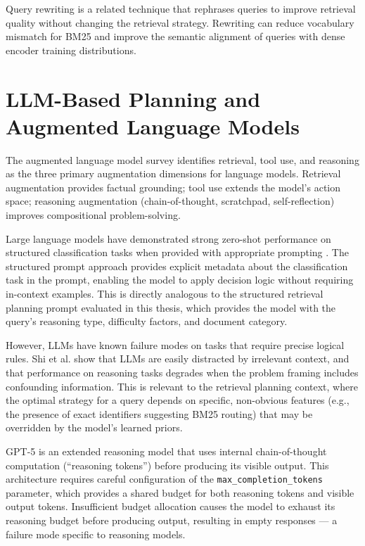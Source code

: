 Query rewriting \citep{ma2023query_rewrite} is a related technique that rephrases queries to improve retrieval quality without changing the retrieval strategy. Rewriting can reduce vocabulary mismatch for BM25 and improve the semantic alignment of queries with dense encoder training distributions.

\section{LLM-Based Planning and Augmented Language Models}
\label{sec:lit_llm_planning}

The augmented language model survey \citep{mialon2023augmented} identifies retrieval, tool use, and reasoning as the three primary augmentation dimensions for language models. Retrieval augmentation provides factual grounding; tool use extends the model's action space; reasoning augmentation (chain-of-thought, scratchpad, self-reflection) improves compositional problem-solving.

Large language models have demonstrated strong zero-shot performance on structured classification tasks when provided with appropriate prompting \citep{wei2022chain}. The structured prompt approach \citep{mialon2023augmented} provides explicit metadata about the classification task in the prompt, enabling the model to apply decision logic without requiring in-context examples. This is directly analogous to the structured retrieval planning prompt evaluated in this thesis, which provides the model with the query's reasoning type, difficulty factors, and document category.

However, LLMs have known failure modes on tasks that require precise logical rules. Shi et al. \citep{shi2023large} show that LLMs are easily distracted by irrelevant context, and that performance on reasoning tasks degrades when the problem framing includes confounding information. This is relevant to the retrieval planning context, where the optimal strategy for a query depends on specific, non-obvious features (e.g., the presence of exact identifiers suggesting BM25 routing) that may be overridden by the model's learned priors.

GPT-5 is an extended reasoning model that uses internal chain-of-thought computation (``reasoning tokens'') before producing its visible output. This architecture requires careful configuration of the \texttt{max\_completion\_tokens} parameter, which provides a shared budget for both reasoning tokens and visible output tokens. Insufficient budget allocation causes the model to exhaust its reasoning budget before producing output, resulting in empty responses --- a failure mode specific to reasoning models.

